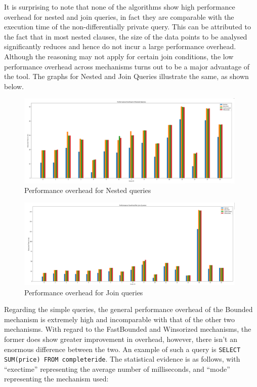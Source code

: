 \documentclass[acmsmall]{acmart}
\begin{document}
It is surprising to note that none of the algorithms show high performance overhead for nested and join queries, in fact they are comparable with the execution time of the non-differentially private query. This can be attributed to the fact that in most nested clauses, the size of the data points to be analysed significantly reduces and hence do not incur a large performance overhead. Although the reasoning may not apply for certain join conditions, the low performance overhead across mechanisms turns out to be a major advantage of the tool. The graphs for Nested and Join Queries illustrate the same, as shown below.

\begin{figure}[htp]
    \centering
    \includegraphics[width=11cm]{Fig 4.4.1.png}
    \caption{Performance overhead for Nested queries}
    \label{Fig:4.4.1}
\end{figure}

\begin{figure}[htp]
    \centering
    \includegraphics[width=11cm]{Fig 4.4.2.png}
    \caption{Performance overhead for Join queries}
    \label{Fig:4.4.2}
\end{figure}

Regarding the simple queries, the general performance overhead of the Bounded mechanism is extremely high and incomparable with that of the other two mechanisms. With regard to the FastBounded and Winsorized mechanisms, the former does show greater improvement in overhead, however, there isn’t an enormous difference between the two. An example of such a  query is \texttt{SELECT SUM(price) FROM completeride}. The statistical evidence is as follows, with “exec\textunderscore time” representing the average number of milliseconds, and “mode” representing the mechanism used:
\end{document}
